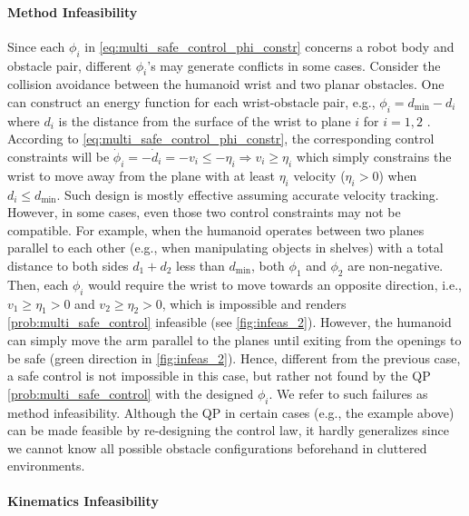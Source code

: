 \paragraph{Method Infeasibility}
Since each $\phi_i$ in \eqref{eq:multi_safe_control_phi_constr} concerns a robot body and obstacle pair, different $\phi_i$'s may generate conflicts in some cases.
Consider the collision avoidance between the humanoid wrist and two planar obstacles.
One can construct an energy function for each wrist-obstacle pair, e.g., $\phi_i = d_\mathrm{min} - d_i$ where $d_i$ is the distance from the surface of the wrist to plane $i$ for $i=1,2$ .
According to \eqref{eq:multi_safe_control_phi_constr}, the corresponding control constraints will be $\dot{\phi}_i = -\dot{d}_i = -v_i \leq -\eta_i \Rightarrow v_i \geq \eta_i$ which simply constrains the wrist to move away from the plane with at least $\eta_i$ velocity ($\eta_i>0$) when $d_i\leq d_\mathrm{min}$.
Such design is mostly effective assuming accurate velocity tracking.
However, in some cases, even those two control constraints may not be compatible.
For example, when the humanoid operates between two planes parallel to each other (e.g., when manipulating objects in shelves) with a total distance to both sides $d_1+d_2$ less than $d_\mathrm{min}$, both $\phi_1$  and $\phi_2$ are non-negative.
Then, each $\phi_i$ would require the wrist to move towards an opposite direction, i.e., $v_1 \geq \eta_1 > 0$ and $v_2 \geq \eta_2 > 0$, which is impossible and renders \eqref{prob:multi_safe_control} infeasible (see \cref{fig:infeas_2}).
However, the humanoid can simply move the arm parallel to the planes until exiting from the openings to be safe (green direction in \cref{fig:infeas_2}).
Hence, different from the previous case, a safe control is not impossible in this case, but rather not found by the QP \eqref{prob:multi_safe_control} with the designed $\phi_i$.
We refer to such failures as method infeasibility.
Although the QP in certain cases (e.g., the example above) can be made feasible by re-designing the control law, it hardly generalizes since we cannot know all possible obstacle configurations beforehand in cluttered environments.

\paragraph{Kinematics Infeasibility}


